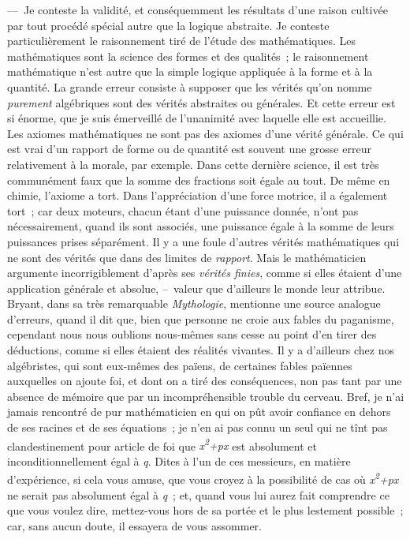 \documentclass[french,twoside]{book} %
\begin{document}
— Je conteste la validité, et conséquemment les résultats d’une raison cultivée par tout procédé spécial autre que la logique abstraite. Je conteste particulièrement le raisonnement tiré de l’étude des mathématiques. Les mathématiques sont la science des formes et des qualités ; le raisonnement mathématique n’est autre que la simple logique appliquée à la forme et à la quantité. La grande erreur consiste à supposer que les vérités qu’on nomme \emph{purement} algébriques sont des vérités abstraites ou générales. Et cette erreur est si énorme, que je suis émerveillé de l’unanimité avec laquelle elle est accueillie. Les axiomes mathématiques ne sont pas des axiomes d’une vérité générale. Ce qui est vrai d’un rapport de forme ou de quantité est souvent une grosse erreur relativement à la morale, par exemple. Dans cette dernière science, il est très communément faux que la somme des fractions soit égale au tout. De même en chimie, l’axiome a tort. Dans l’appréciation d’une force motrice, il a également tort ; car deux moteurs, chacun étant d’une puissance donnée, n’ont pas nécessairement, quand ils sont associés, une puissance égale à la somme de leurs puissances prises séparément. Il y a une foule d’autres vérités mathématiques qui ne sont des vérités que dans des limites de \emph{rapport}. Mais le mathématicien argumente incorrigiblement d’après ses \emph{vérités finies}, comme si elles étaient d’une application générale et absolue, – valeur que d’ailleurs le monde leur attribue. Bryant, dans sa très remarquable \emph{Mythologie}, mentionne une source analogue d’erreurs, quand il dit que, bien que personne ne croie aux fables du paganisme, cependant nous nous oublions nous-mêmes sans cesse au point d’en tirer des déductions, comme si elles étaient des réalités vivantes. Il y a d’ailleurs chez nos algébristes, qui sont eux-mêmes des païens, de certaines fables païennes auxquelles on ajoute foi, et dont on a tiré des conséquences, non pas tant par une absence de mémoire que par un incompréhensible trouble du cerveau. Bref, je n’ai jamais rencontré de pur mathématicien en qui on pût avoir confiance en dehors de ses racines et de ses équations ; je n’en ai pas connu un seul qui ne tînt pas clandestinement pour article de foi que \emph{x\textsuperscript{2}+px} est absolument et inconditionnellement égal à \emph{q}. Dites à l’un de ces messieurs, en matière d’expérience, si cela vous amuse, que vous croyez à la possibilité de cas où \emph{x\textsuperscript{2}+px} ne serait pas absolument égal à \emph{q} ; et, quand vous lui aurez fait comprendre ce que vous voulez dire, mettez-vous hors de sa portée et le plus lestement possible ; car, sans aucun doute, il essayera de vous assommer.\par
\end{document}
